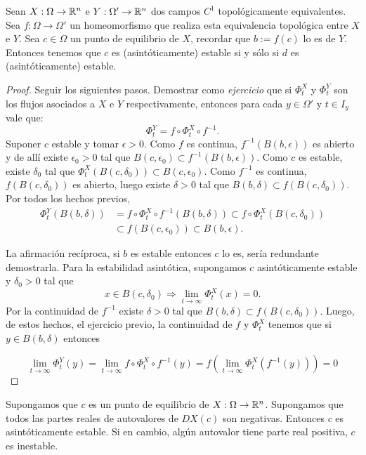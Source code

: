  

 


 \begin{teorema}{} Sean $X:\Omega\to\mathbb{R}^n$ e 
  $Y:\Omega'\to\mathbb{R}^n$ dos campos $C^1$ topológicamente equivalentes. Sea $f:\Omega\to\Omega'$ un homeomorfismo 
  que realiza esta equivalencia topológica entre $X$ e $Y$. Sea $c\in\Omega$ un punto de equilibrio de $X$, recordar que
  $b:=f(c)$ lo es de $Y$. Entonces tenemos que  $c$ es (asintóticamente) estable  si y sólo si $d$ es 
  (asintóticamente) estable.
\end{teorema}
\begin{proof}
 Seguir los siguientes pasos. Demostrar  como  \emph{ejercicio} que si $\Phi_t^X$ y $\Phi_t^Y$ son los flujos asociados
 a $X$ e $Y$ respectivamente, entonces para cada $y\in\Omega'$ y $t\in I_y$ vale que:
 \[\Phi_t^Y=f\circ\Phi_t^X\circ f^{-1}.\]
 Suponer $c$ estable y tomar $\epsilon>0$. Como $f$ es continua, $f^{-1}(B(b,\epsilon))$ es abierto
 y de allí existe $\epsilon_0>0$ tal que $B(c,\epsilon_0)\subset f^{-1}( B(b,\epsilon))$. Como  $c$ es estable, existe 
 $\delta_0$ tal que $\Phi_t^X(B(c,\delta_0))\subset B(c,\epsilon_0)$. Como $f^{-1}$ es continua, 
 $f(B(c,\delta_0))$ es abierto, luego existe $\delta>0$ tal que $B(b,\delta)\subset f(B(c,\delta_0))$. 
 Por todos los hechos previos,
 \[
  \begin{split} 
    \Phi_t^Y(B(b,\delta) )&=f\circ\Phi_t^X\circ f^{-1}(B(b,\delta) )\subset  f\circ\Phi_t^X(B(c,\delta_0))\\
	&\subset f(B(c,\epsilon_0)) \subset B(b,\epsilon).
   \end{split} 
 \]

 La afirmación recíproca, si $b$ es estable entonces $c$ lo es, sería redundante demostrarla. 
Para la estabilidad asintótica, supongamos $c$ asintóticamente estable y $\delta_0>0$  tal que 
\[x\in B(c,\delta_0)\Rightarrow \lim_{t\to\infty}\Phi_t^X(x)=0.\]
Por la continuidad de $f^{-1}$ existe $\delta>0$ tal que $B(b,\delta)\subset f(B(c,\delta_0))$. Luego, 
de estos hechos, el ejercicio previo, la continuidad de $f$ y $\Phi_t^X$ tenemos
que si $y\in B(b,\delta)$ entonces
 
 \[\lim_{t\to\infty}\Phi_t^Y(y)=\lim_{t\to\infty}f\circ\Phi_t^X\circ f^{-1}(y)=
 f\left( \lim_{t\to\infty}\Phi_t^X (f^{-1}(y))\right)=0\]
 
\end{proof}

\begin{corolario}{}
Supongamos que $c$ es un punto de equilibrio de $X:\Omega\to\mathbb{R}^n$. Supongamos que todos las partes reales de
 autovalores de 
 $DX(c)$ son negativas. Entonces $c$ es asintóticamente estable. Si en cambio, algún autovalor tiene parte real
 positiva, $c$ es inestable.
\end{corolario}

